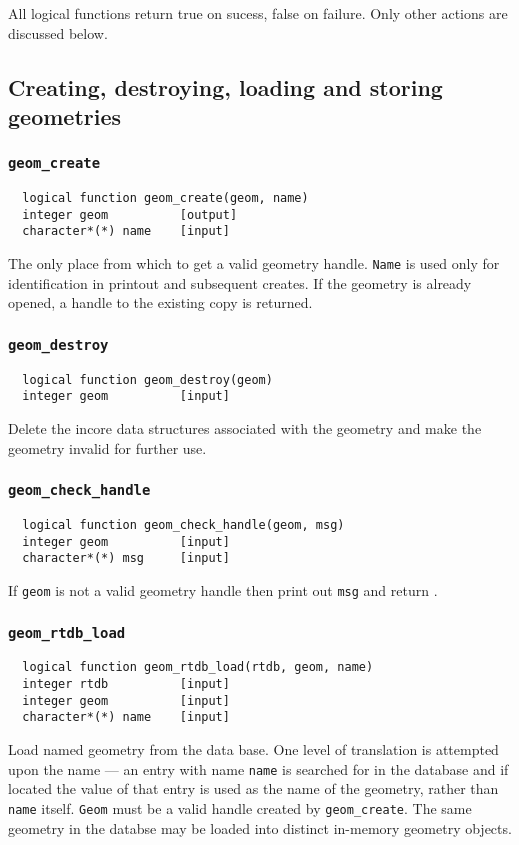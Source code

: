 All logical functions return true on sucess, false on failure.  Only
other actions are discussed below.

\subsection{Creating, destroying, loading and storing geometries}

\subsubsection{{\tt geom\_create}}
\begin{verbatim}
  logical function geom_create(geom, name)
  integer geom          [output]
  character*(*) name    [input]
\end{verbatim}
The only place from which to get a valid geometry handle.  {\tt Name}
is used only for identification in printout and subsequent creates.
If the geometry is already opened, a handle to the existing copy is
returned.

\subsubsection{{\tt geom\_destroy}}
\begin{verbatim}
  logical function geom_destroy(geom)
  integer geom          [input]
\end{verbatim}
Delete the incore data structures associated with the geometry and
make the geometry invalid for further use.

\subsubsection{{\tt geom\_check\_handle}}
\begin{verbatim}
  logical function geom_check_handle(geom, msg)
  integer geom          [input]
  character*(*) msg     [input]
\end{verbatim}
If {\tt geom} is not a valid geometry handle then print out {\tt msg}
and return \FALSE.

\subsubsection{{\tt geom\_rtdb\_load}}
\begin{verbatim}
  logical function geom_rtdb_load(rtdb, geom, name)
  integer rtdb          [input]
  integer geom          [input]
  character*(*) name    [input]
\end{verbatim}
Load named geometry from the data base.  One level of translation is
attempted upon the name --- an entry with name {\tt name} is searched
for in the database and if located the value of that entry is used as
the name of the geometry, rather than {\tt name} itself.  {\tt Geom}
must be a valid handle created by \verb+geom_create+.  The same
geometry in the databse may be loaded into distinct in-memory geometry
objects.

